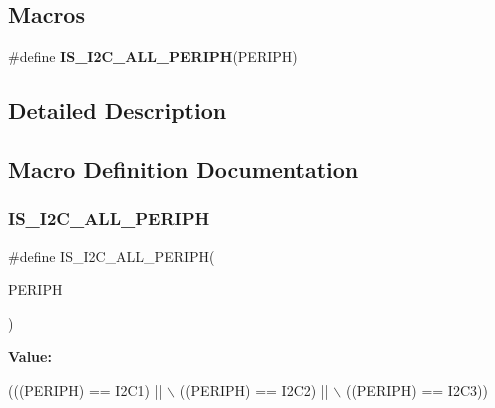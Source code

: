 \subsection*{Macros}
\begin{DoxyCompactItemize}
\item 
\#define {\bfseries I\+S\+\_\+\+I2\+C\+\_\+\+A\+L\+L\+\_\+\+P\+E\+R\+I\+PH}(P\+E\+R\+I\+PH)
\end{DoxyCompactItemize}


\subsection{Detailed Description}


\subsection{Macro Definition Documentation}
\mbox{\label{group___i2_c___exported___constants_ga2e57489a40603d6ab7ff115b94eeb303}} 
\subsubsection{\texorpdfstring{I\+S\+\_\+\+I2\+C\+\_\+\+A\+L\+L\+\_\+\+P\+E\+R\+I\+PH}{IS\_I2C\_ALL\_PERIPH}}
{\footnotesize\ttfamily \#define I\+S\+\_\+\+I2\+C\+\_\+\+A\+L\+L\+\_\+\+P\+E\+R\+I\+PH(\begin{DoxyParamCaption}\item[{}]{P\+E\+R\+I\+PH }\end{DoxyParamCaption})}

{\bfseries Value\+:}
\begin{DoxyCode}
(((PERIPH) == I2C1) || \(\backslash\)
                                   ((PERIPH) == I2C2) || \(\backslash\)
                                   ((PERIPH) == I2C3))
\end{DoxyCode}
